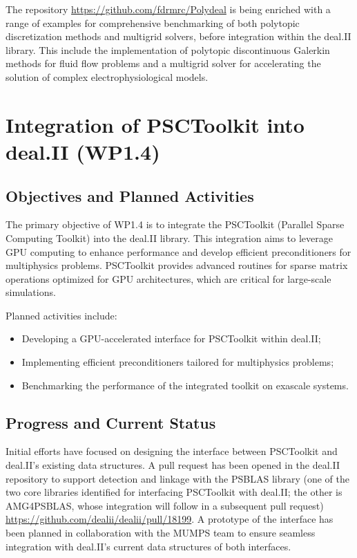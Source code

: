 \documentclass[a4paper,12pt]{article}
\begin{document}
The repository \url{https://github.com/fdrmrc/Polydeal} is being enriched with a range of examples for comprehensive benchmarking of both polytopic discretization methods and multigrid solvers, before integration within the deal.II library. This include the implementation of polytopic discontinuous Galerkin methods for fluid flow problems and a multigrid solver for accelerating the solution of complex electrophysiological models.

\section{Integration of PSCToolkit into deal.II (WP1.4)}
    \subsection{Objectives and Planned Activities}
        The primary objective of WP1.4 is to integrate the PSCToolkit (Parallel Sparse Computing Toolkit) into the deal.II library. This integration aims to leverage GPU computing to enhance performance and develop efficient preconditioners for multiphysics problems. PSCToolkit provides advanced routines for sparse matrix operations optimized for GPU architectures, which are critical for large-scale simulations.

        Planned activities include:
        \begin{itemize}
            \item Developing a GPU-accelerated interface for PSCToolkit within deal.II;
            \item Implementing efficient preconditioners tailored for multiphysics problems;
            \item Benchmarking the performance of the integrated toolkit on exascale systems.
        \end{itemize}

        \subsection{Progress and Current Status}
        Initial efforts have focused on designing the interface between PSCToolkit and deal.II's existing data structures. A pull request has been opened in the deal.II repository to support detection and linkage with the PSBLAS library (one of the two core libraries identified for interfacing PSCToolkit with deal.II; the other is AMG4PSBLAS, whose integration will follow in a subsequent pull request) \url{https://github.com/dealii/dealii/pull/18199}. A prototype of the interface has been planned in collaboration with the MUMPS team to ensure seamless integration with deal.II's current data structures of both interfaces.
\end{document}
